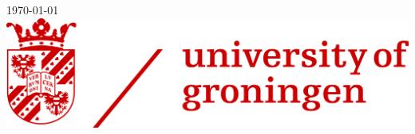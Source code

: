 \documentclass[
11pt, %
english, %
singlespacing, %
headsepline, %
]{MastersDoctoralThesis} %
\begin{document}
\begin{titlepage}
\begin{center}
\vfill

{\large \today}\\[4cm] %
\vspace{-1in}
\includegraphics[scale=0.1]{./Figures/logo.jpg} %

\vfill
\end{center}
\end{titlepage}




\tableofcontents %

\listoffigures %





\mainmatter %

\pagestyle{thesis} %










\end{document}
